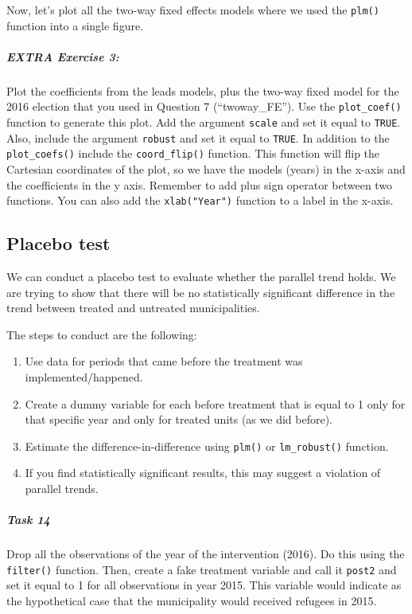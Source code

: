 \documentclass[
]{article}
\providecommand{\tightlist}{%
  \setlength{\itemsep}{0pt}\setlength{\parskip}{0pt}}
\begin{document}
Now, let's plot all the two-way fixed effects models where we used the
\texttt{plm()} function into a single figure.

\subparagraph{EXTRA Exercise 3:}\label{extra-exercise-3}

Plot the coefficients from the leads models, plus the two-way fixed
model for the 2016 election that you used in Question 7
(``twoway\_FE''). Use the \texttt{plot\_coef()} function to generate
this plot. Add the argument \texttt{scale} and set it equal to
\texttt{TRUE}. Also, include the argument \texttt{robust} and set it
equal to \texttt{TRUE}. In addition to the \texttt{plot\_coefs()}
include the \texttt{coord\_flip()} function. This function will flip the
Cartesian coordinates of the plot, so we have the models (years) in the
x-axis and the coefficients in the y axis. Remember to add plus sign
operator between two functions. You can also add the
\texttt{xlab("Year")} function to a label in the x-axis.

\subsection{Placebo test}\label{placebo-test}

We can conduct a placebo test to evaluate whether the parallel trend
holds. We are trying to show that there will be no statistically
significant difference in the trend between treated and untreated
municipalities.

The steps to conduct are the following:

\begin{enumerate}
\def\labelenumi{\arabic{enumi}.}
\tightlist
\item
  Use data for periods that came before the treatment was
  implemented/happened.
\item
  Create a dummy variable for each before treatment that is equal to 1
  only for that specific year and only for treated units (as we did
  before).
\item
  Estimate the difference-in-difference using \texttt{plm()} or
  \texttt{lm\_robust()} function.
\item
  If you find statistically significant results, this may suggest a
  violation of parallel trends.
\end{enumerate}

\subparagraph{Task 14}\label{task-14}

Drop all the observations of the year of the intervention (2016). Do
this using the \texttt{filter()} function. Then, create a fake treatment
variable and call it \texttt{post2} and set it equal to 1 for all
observations in year 2015. This variable would indicate as the
hypothetical case that the municipality would received refugees in 2015.
\end{document}
